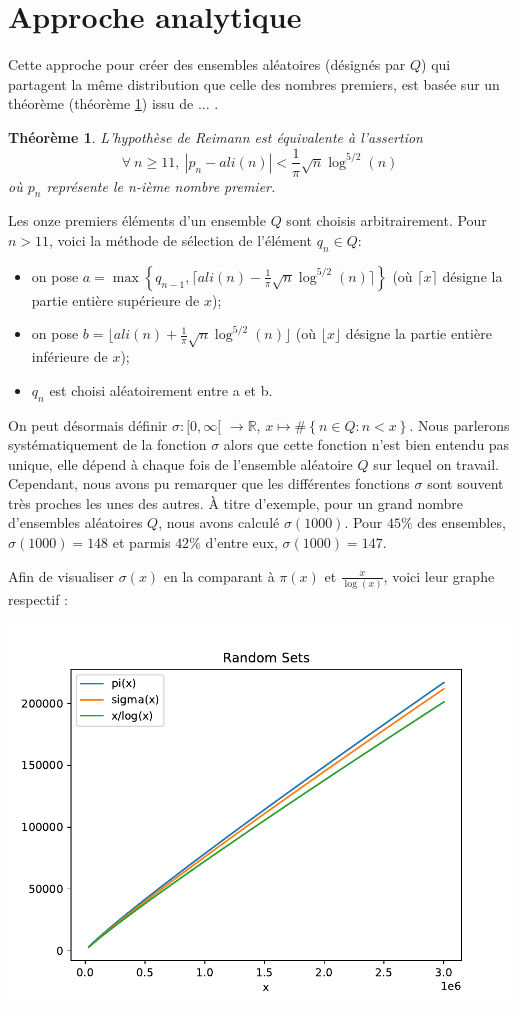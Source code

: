 \documentclass [a4paper, 11pt, twoside] {article}
\begin{document}
\theoremstyle{plain}
\newtheorem{Thm}{Théorème}

\section{Approche analytique}

Cette approche pour créer des ensembles aléatoires (désignés par $Q$) qui partagent la même distribution que celle des nombres
premiers, est basée sur un théorème (théorème \ref{theorem}) issu de ... . 

\begin{Thm}
\label{theorem}
	L'hypothèse de Reimann est équivalente à l'assertion 
	\[
	\forall \ n \geqslant 11, \ |p_{n} - ali(n) | < \frac{1}{\pi} \sqrt{n} \log^{5/2}(n) 
	\]
	où $p_{n}$ représente le n-ième nombre premier.
\end{Thm}

Les onze premiers éléments d'un ensemble $Q$ sont choisis arbitrairement. 
Pour $ n > 11 $, voici la méthode de sélection  de l'élément $q_{n} \in Q$: 
\begin{itemize}
	\item on pose $ a = \max \left\{ q_{n-1} ,\lceil{ali(n) - \frac{1}{\pi} \sqrt{n} \log^{5/2}(n) \rceil} \right\}$ 
	(où $\lceil x \rceil$ désigne la partie entière supérieure de $x$);
	\item on pose $ b = \lfloor ali(n) + \frac{1}{\pi} \sqrt{n} \log^{5/2}(n) \rfloor $
	(où $\lfloor x \rfloor$ désigne la partie entière inférieure de $x$);
	\item $ q_{n} $ est choisi aléatoirement entre a et b. 
\end{itemize}

On peut désormais définir $ \sigma : [0, \infty [$  $\rightarrow \mathbb{R} $, $ x \mapsto \# \left\{ n \in Q : n < x \right\} $. Nous parlerons systématiquement de  la fonction $\sigma$ alors que cette fonction n'est bien entendu pas unique, elle dépend à chaque fois de l'ensemble aléatoire $Q$ sur lequel on travail. Cependant, nous avons pu remarquer que  les différentes fonctions $\sigma$ sont souvent très proches les unes des autres. À titre d'exemple,  pour un grand nombre d'ensembles aléatoires $Q$, nous avons calculé $\sigma(1000)$. Pour $45 \%$ des ensembles, $\sigma(1000) = 148$ et parmis $42\%$ d'entre eux, $\sigma(1000) = 147$.

Afin de visualiser  $\sigma(x)$ en la comparant à $\pi(x)$ et $\frac{x}{\log(x)}$, voici leur graphe respectif : 

\includegraphics{approche_analytique_sets_2.pdf}
\end{document}
